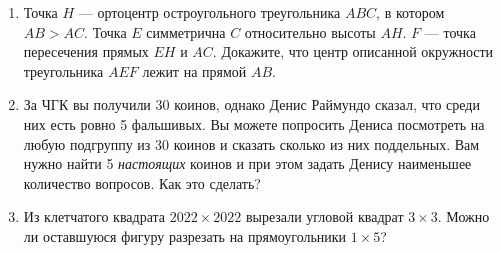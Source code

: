 \documentclass{article}
\begin{document}
\begin{enumerate}
\item Точка $H$ — ортоцентр остроугольного треугольника $ABC$, в котором $AB > AC$. Точка $E$ симметрична $C$ относительно высоты $AH$. $F$ — точка пересечения прямых $EH$ и $AC$. Докажите, что центр описанной окружности треугольника $AEF$ лежит на прямой $AB$.
\item За ЧГК вы получили 30 коинов, однако Денис Раймундо сказал, что среди них есть ровно 5 фальшивых. Вы можете попросить Дениса посмотреть на любую подгруппу из 30 коинов и сказать сколько из них поддельных. Вам нужно найти 5 \textit{настоящих} коинов и при этом задать Денису наименьшее количество вопросов. Как это сделать?

\item Из клетчатого квадрата $2022 \times 2022$ вырезали угловой квадрат $3 \times 3$. Можно ли оставшуюся фигуру разрезать на прямоугольники $1 \times 5$?

\end{enumerate}
\end{document}
